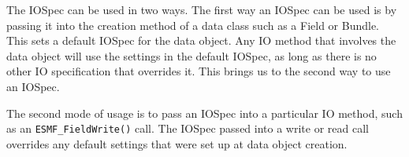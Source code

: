 

The IOSpec can be used in two ways.  The first way an IOSpec can 
be used is by passing it into the creation method of a data class 
such as a Field or Bundle.  This sets a default IOSpec for the 
data object.  Any IO method that involves the data object will 
use the settings in the default IOSpec, as long as there is no 
other IO specification that overrides it.  This brings us to the 
second way to use an IOSpec.  

The second mode of usage is to pass an IOSpec into a particular 
IO method, such as an {\tt ESMF\_FieldWrite()} call.  The IOSpec 
passed into a write or read call overrides any default settings 
that were set up at data object creation.
